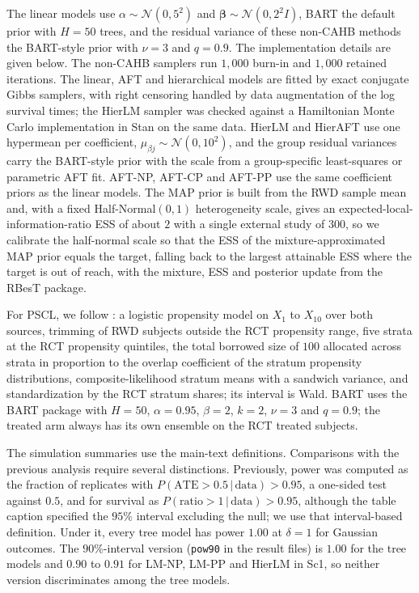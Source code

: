 \documentclass[11pt]{article}
\newcommand{\Normal}{\mathcal{N}}
\newcommand{\given}{\,\vert\,}
\theoremstyle{definition}
\theoremstyle{plain}
\begin{document}
The linear models use $\alpha\sim\Normal(0,5^2)$ and $\bm\beta\sim\Normal(0,2^2I)$, BART the default prior with $H=50$ trees, and the residual variance of these non-CAHB methods the BART-style prior with $\nu=3$ and $q=0.9$. The implementation details are given below. The non-CAHB samplers run $1{,}000$ burn-in and $1{,}000$ retained iterations. The linear, AFT and hierarchical models are fitted by exact conjugate Gibbs samplers, with right censoring handled by data augmentation of the log survival times; the HierLM sampler was checked against a Hamiltonian Monte Carlo implementation in Stan on the same data. HierLM and HierAFT use one hypermean per coefficient, $\mu_{\beta j}\sim\Normal(0,10^2)$, and the group residual variances carry the BART-style prior with the scale from a group-specific least-squares or parametric AFT fit. AFT-NP, AFT-CP and AFT-PP use the same coefficient priors as the linear models. The MAP prior is built from the RWD sample mean and, with a fixed Half-Normal$(0,1)$ heterogeneity scale, gives an expected-local-information-ratio ESS of about $2$ with a single external study of $300$, so we calibrate the half-normal scale so that the ESS of the mixture-approximated MAP prior equals the target, falling back to the largest attainable ESS where the target is out of reach, with the mixture, ESS and posterior update from the RBesT package.

For PSCL, we follow \citet{Chen2020PSCL}: a logistic propensity model on $X_1$ to $X_{10}$ over both sources, trimming of RWD subjects outside the RCT propensity range, five strata at the RCT propensity quintiles, the total borrowed size of $100$ allocated across strata in proportion to the overlap coefficient of the stratum propensity distributions, composite-likelihood stratum means with a sandwich variance, and standardization by the RCT stratum shares; its interval is Wald. BART uses the BART package with $H=50$, $\alpha=0.95$, $\beta=2$, $k=2$, $\nu=3$ and $q=0.9$; the treated arm always has its own ensemble on the RCT treated subjects.

The simulation summaries use the main-text definitions. Comparisons with the previous analysis require several distinctions. Previously, power was computed as the fraction of replicates with $P(\mathrm{ATE}>0.5\given\text{data})>0.95$, a one-sided test against $0.5$, and for survival as $P(\text{ratio}>1\given\text{data})>0.95$, although the table caption specified the $95\%$ interval excluding the null; we use that interval-based definition. Under it, every tree model has power $1.00$ at $\delta=1$ for Gaussian outcomes. The $90\%$-interval version (\texttt{pow90} in the result files) is $1.00$ for the tree models and $0.90$ to $0.91$ for LM-NP, LM-PP and HierLM in Sc1, so neither version discriminates among the tree models.
\end{document}
